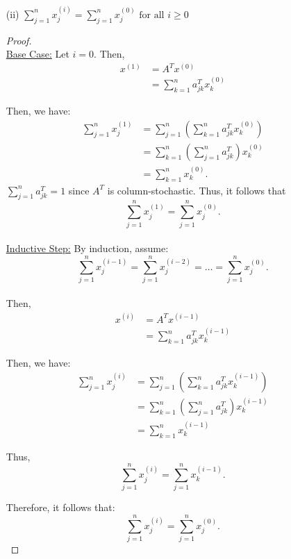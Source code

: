 \documentclass[12pt]{article}
\begin{document}
\begin{itemize}
\begin{itemize}
\begin{proof}
\end{proof}

\item[(ii)] $\sum_{j=1}^n x_j^{(i)} = \sum_{j=1}^n x_j^{(0)} \text{ for all } i \geq 0$\\
\begin{proof} $\text{ }$\\

\underline{Base Case:} Let $i = 0$.  Then,\\
\begin{align}
x^{(1)} &= A^T x^{(0)} \nonumber \\
&= \sum_{k=1}^n a^T_{jk} x^{(0)}_k \nonumber
\end{align}

Then, we have:\\
\begin{align}
\sum_{j=1}^n x^{(1)}_j &= \sum_{j=1}^n \left( \sum_{k=1}^n a^T_{jk} 			x^{(0)}_k\right) \nonumber \\
&= \sum_{k=1}^n \left( \sum_{j=1}^n a^T_{jk}\right)x^{(0)}_k \nonumber \\
&= \sum_{k=1}^n x^{(0)}_k. \nonumber
\end{align}
$\sum_{j=1}^n a^T_{jk} = 1$ since $A^T$ is column-stochastic.  Thus, it follows that
$$\sum_{j=1}^n x^{(1)}_j = \sum_{j=1}^n x^{(0)}_j.$$\\

\underline{Inductive Step:} By induction, assume:\\
$$\sum_{j=1}^n x^{(i-1)}_j = \sum_{j=1}^n x^{(i-2)}_j = \dots = \sum_{j=1}^n x^{(0)}_j.$$\\

Then,
\begin{align}
x^{(i)} &= A^T x^{(i-1)} \nonumber \\
&= \sum_{k=1}^n a^T_{jk} x^{(i-1)}_k \nonumber
\end{align}

Then, we have:
\begin{align}
\sum_{j=1}^n x^{(i)}_j &= \sum_{j=1}^n \left(\sum_{k=1}^n a^T_{jk} x^{(i-1)}_k \right) \nonumber \\
&= \sum_{k=1}^n \left(\sum_{j=1}^n a^T_{jk}\right) x^{(i-1)}_k \nonumber \\
&= \sum_{k=1}^n x^{(i-1)}_k \nonumber
\end{align}

Thus,\\
$$\sum_{j=1}^n x^{(i)}_j = \sum_{j=1}^n x^{(i-1)}_k.$$

Therefore, it follows that:
$$\sum_{j=1}^n x^{(i)}_j = \sum_{j=1}^n x^{(0)}_j.$$


\end{proof}
\end{itemize}
\end{itemize}
\end{document}
